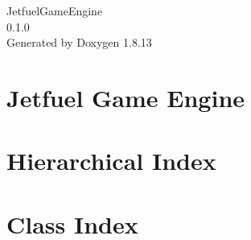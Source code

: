 \documentclass[twoside]{book}
\newcommand{\+}{\discretionary{\mbox{\scriptsize$\hookleftarrow$}}{}{}}
\newcommand{\clearemptydoublepage}{%
  \newpage{\pagestyle{empty}\cleardoublepage}%
}
\begin{document}
\hypersetup{pageanchor=false,
             bookmarksnumbered=true,
             pdfencoding=unicode
            }
\begin{titlepage}
\vspace*{7cm}
\begin{center}%
{\Large Jetfuel\+Game\+Engine \\[1ex]\large 0.\+1.\+0 }\\
\vspace*{1cm}
{\large Generated by Doxygen 1.8.13}\\
\end{center}
\end{titlepage}
\clearemptydoublepage
{}
\tableofcontents
\clearemptydoublepage
{}
\hypersetup{pageanchor=true}

\chapter{Jetfuel Game Engine}
\label{index}\hypertarget{index}{}
\chapter{Hierarchical Index}

\chapter{Class Index}

\end{document}
